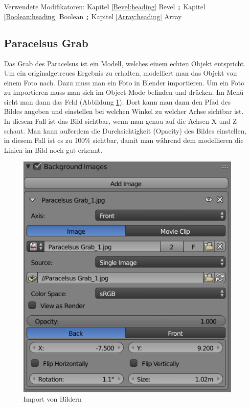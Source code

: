Verwendete Modifikatoren: Kapitel \ref{Bevel:heading} Bevel \verb+;+ Kapitel \ref{Boolean:heading} Boolean \verb+;+ Kapitel \ref{Array:heading} Array

\subsection{Paracelsus Grab}
\label{paracelsusgrab:ref1}
Das Grab des Paracelsus ist ein Modell, welches einem echten Objekt entspricht. Um ein originalgetreues Ergebnis zu erhalten,
modelliert man das Objekt von einem Foto nach. Dazu muss man ein Foto in Blender importieren. Um ein Foto zu importieren muss man sich im Object Mode befinden und 
drücken. Im Menü sieht man dann das Feld  (Abbildung \ref{Paracelsus_Grab:image1}). Dort kann man dann den Pfad des Bildes angeben
und einstellen bei welchen Winkel zu welcher Achse sichtbar ist. In diesem Fall ist das Bild sichtbar, wenn man genau auf die Achsen X und Z schaut. Man kann außerdem die
Durchsichtigkeit (Opacity) des Bildes einstellen, in diesem Fall ist es zu 100\% sichtbar, damit man während dem modellieren die Linien im Bild noch gut erkennt.

\raggedbottom
\begin{figure}[H]
    \centering
    \includegraphics[width=.8\textwidth]{images/Paracelsus-Grab_Import-von-Bildern.png}
    \caption{Import von Bildern}
    \label{Paracelsus_Grab:image1}
\end{figure}


